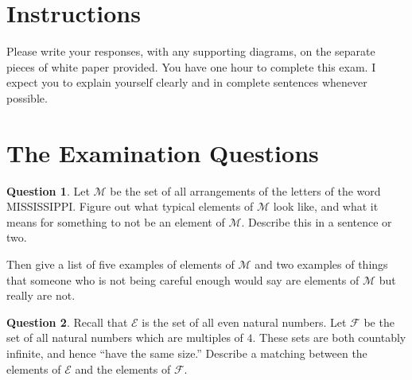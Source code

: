 \documentclass[12pt,letterpaper]{article}
\theoremstyle{definition}
\newtheorem{question}{Question}
\begin{document}
\setlength{\parskip}{1ex plus 0.5ex minus 0.2ex}
\setlength{\parindent}{0pt}

\pagestyle{fancy}
\cfoot{}

\section*{Instructions}
Please write your responses, with any supporting diagrams, on the separate pieces of white paper provided.  You have one hour to complete this exam. I expect you to explain yourself clearly and in complete sentences whenever possible.

\section*{The Examination Questions}

\begin{question}
Let $\mathcal{M}$ be the set of all arrangements of the letters of the word MISSISSIPPI.
Figure out what typical elements of $\mathcal{M}$ look like, and what it means for something to not be an element of $\mathcal{M}$.
Describe this in a sentence or two.

Then give a list of five examples of elements of $\mathcal{M}$ and two examples of things that someone who is not being careful enough would say are elements of $\mathcal{M}$ but really are not.
\end{question}



\vspace{.5in}

\begin{question}
Recall that $\mathcal{E}$ is the set of all even natural numbers.
Let $\mathcal{F}$ be the set of all natural numbers which are multiples of $4$.
These sets are both countably infinite, and hence ``have the same size.''
Describe a matching between the elements of $\mathcal{E}$ and the elements of $\mathcal{F}$.
\end{question}
\end{document}

